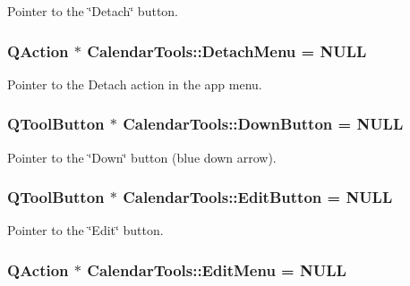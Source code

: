 Pointer to the \char`\"{}\-Detach\char`\"{} button. 

\hypertarget{struct_calendar_tools_a09210d97a0a3aaf912aaa2389a076ff3}{
\subsubsection[{Detach\-Menu}]{\setlength{\rightskip}{0pt plus 5cm}Q\-Action $\ast$ Calendar\-Tools\-::\-Detach\-Menu = N\-U\-L\-L\hspace{0.3cm}{\ttfamily [static]}}}\label{struct_calendar_tools_a09210d97a0a3aaf912aaa2389a076ff3}


Pointer to the Detach action in the app menu. 

\hypertarget{struct_calendar_tools_a9a5b20ba0477c0debcf109039d929eb0}{
\subsubsection[{Down\-Button}]{\setlength{\rightskip}{0pt plus 5cm}Q\-Tool\-Button $\ast$ Calendar\-Tools\-::\-Down\-Button = N\-U\-L\-L\hspace{0.3cm}{\ttfamily [static]}}}\label{struct_calendar_tools_a9a5b20ba0477c0debcf109039d929eb0}


Pointer to the \char`\"{}\-Down\char`\"{} button (blue down arrow). 

\hypertarget{struct_calendar_tools_a9104f9618315fc0072bc3004010e5aa4}{
\subsubsection[{Edit\-Button}]{\setlength{\rightskip}{0pt plus 5cm}Q\-Tool\-Button $\ast$ Calendar\-Tools\-::\-Edit\-Button = N\-U\-L\-L\hspace{0.3cm}{\ttfamily [static]}}}\label{struct_calendar_tools_a9104f9618315fc0072bc3004010e5aa4}


Pointer to the \char`\"{}\-Edit\char`\"{} button. 

\hypertarget{struct_calendar_tools_a7f5675473159417f0d1fe16888f105b8}{
\subsubsection[{Edit\-Menu}]{\setlength{\rightskip}{0pt plus 5cm}Q\-Action $\ast$ Calendar\-Tools\-::\-Edit\-Menu = N\-U\-L\-L\hspace{0.3cm}{\ttfamily [static]}}}\label{struct_calendar_tools_a7f5675473159417f0d1fe16888f105b8}


